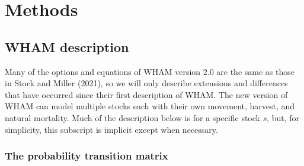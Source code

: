 \documentclass[
]{article}
\begin{document}
\hypertarget{methods}{%
\section*{Methods}\label{methods}}

\hypertarget{wham-description}{%
\subsection*{WHAM description}\label{wham-description}}

Many of the options and equations of WHAM version 2.0 are the same as those in Stock and Miller (2021), so we will only describe extensions and differences that have occurred since their first description of WHAM. The new version of WHAM can model multiple stocks each with their own movement, harvest, and natural mortality. Much of the description below is for a specific stock \(s\), but, for simplicity, this subscript is implicit except when necessary.

\hypertarget{the-probability-transition-matrix}{%
\subsubsection*{The probability transition matrix}\label{the-probability-transition-matrix}}
\end{document}

